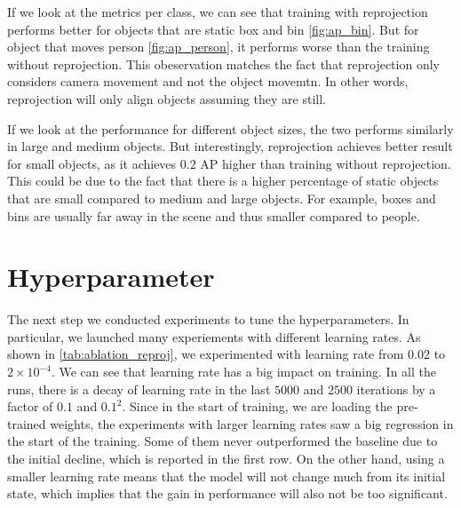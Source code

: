 If we look at the metrics per class, we can see that training with reprojection performs better for objects that are static \eg box and bin \ref{fig:ap_bin}. But for object that moves \eg person \ref{fig:ap_person}, it performs worse than the training without reprojection. This obeservation matches the fact that reprojection only considers camera movement and not the object movemtn. In other words, reprojection will only align objects assuming they are still. 

If we look at the performance for different object sizes, the two performs similarly in large and medium objects. But interestingly, reprojection achieves better result for small objects, as it achieves $0.2$ AP higher than training without reprojection. This could be due to the fact that there is a higher percentage of static objects that are small compared to medium and large objects. For example, boxes and bins are usually far away in the scene and thus smaller compared to people.

 




\section{Hyperparameter}
The next step we conducted experiments to tune the hyperparameters. In particular, we launched many experiements with different learning rates. As shown in \ref{tab:ablation_reproj}, we experimented with learning rate from $0.02$ to $2\times 10^{-4}$. We can see that learning rate has a big impact on training. In all the runs, there is a decay of learning rate in the last $5000$ and $2500$ iterations by a factor of $0.1$ and $0.1^2$. Since in the start of training, we are loading the pre-trained weights, the experiments with larger learning rates saw a big regression in the start of the training. Some of them never outperformed the baseline due to the initial decline, which is reported in the first row. On the other hand, using a smaller learning rate means that the model will not change much from its initial state, which implies that the gain in performance will also not be too significant. 


 